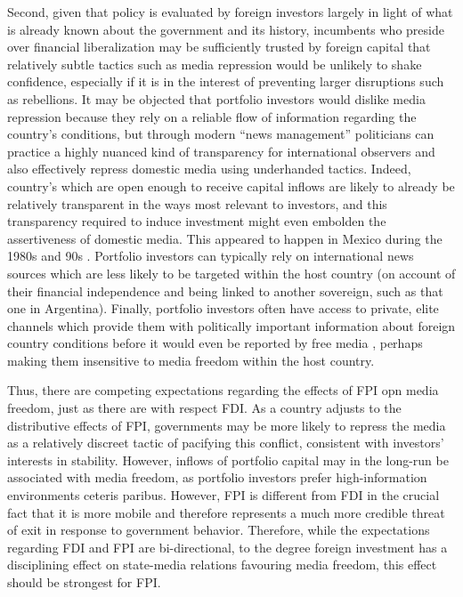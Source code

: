 \documentclass[12pt,a4paper]{article}\usepackage[]{graphicx}\usepackage[]{color}
\begin{document}
Second, given that policy is evaluated by foreign investors largely in light of what is already known about the government and its history, incumbents who preside over financial liberalization may be sufficiently trusted by foreign capital that relatively subtle tactics such as media repression would be unlikely to shake confidence, especially if it is in the interest of preventing larger disruptions such as rebellions. It may be objected that portfolio investors would dislike media repression because they rely on a reliable flow of information regarding the country's conditions, but through modern “news management” politicians can practice a highly nuanced kind of transparency for international observers and also effectively repress domestic media using underhanded tactics. Indeed, country's which are open enough to receive capital inflows are likely to already be relatively transparent in the ways most relevant to investors, and this transparency required to induce investment might even embolden the assertiveness of domestic media. This appeared to happen in Mexico during the 1980s and 90s \parencite{lawson2002building}. Portfolio investors can typically rely on international news sources which are less likely to be targeted within the host country (on account of their financial independence and being linked to another sovereign, such as that one in Argentina). Finally, portfolio investors often have access to private, elite channels which provide them with politically important information about foreign country conditions before it would even be reported by free media \parencite{Dube:2011ir}, perhaps making them insensitive to media freedom within the host country.

Thus, there are competing expectations regarding the effects of FPI opn media freedom, just as there are with respect FDI. As a country adjusts to the distributive effects of FPI, governments may be more likely to repress the media as a relatively discreet tactic of pacifying this conflict, consistent with investors' interests in stability. However, inflows of portfolio capital may in the long-run be associated with media freedom, as portfolio investors prefer high-information environments ceteris paribus. However, FPI is different from FDI in the crucial fact that it is more mobile and therefore represents a much more credible threat of exit in response to government behavior. Therefore, while the expectations regarding FDI and FPI are bi-directional, to the degree foreign investment has a disciplining effect on state-media relations favouring media freedom, this effect should be strongest for FPI.
\end{document}
